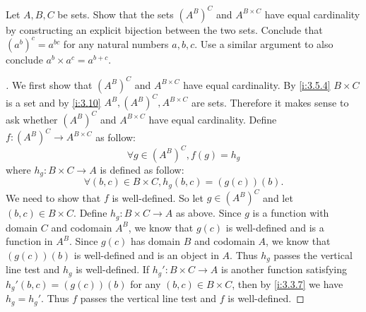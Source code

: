 \begin{ex}\label{i:ex:3.6.6}
  Let \(A, B, C\) be sets.
  Show that the sets \((A^B)^C\) and \(A^{B \times C}\) have equal cardinality by constructing an explicit bijection between the two sets.
  Conclude that \((a^b)^c = a^{bc}\) for any natural numbers \(a, b, c\).
  Use a similar argument to also conclude \(a^b \times a^c = a^{b+c}\).
\end{ex}

\begin{proof}[]
  We first show that \((A^B)^C\) and \(A^{B \times C}\) have equal cardinality.
  By \cref{i:3.5.4} \(B \times C\) is a set and by \cref{i:3.10} \(A^B, (A^B)^C, A^{B \times C}\) are sets.
  Therefore it makes sense to ask whether \((A^B)^C\) and \(A^{B \times C}\) have equal cardinality.
  Define \(f : (A^B)^C \to A^{B \times C}\) as follow:
  \[
    \forall g \in (A^B)^C, f(g) = h_g
  \]
  where \(h_g : B \times C \to A\) is defined as follow:
  \[
    \forall (b, c) \in B \times C, h_g(b, c) = (g(c))(b).
  \]
  We need to show that \(f\) is well-defined.
  So let \(g \in (A^B)^C\) and let \((b, c) \in B \times C\).
  Define \(h_g : B \times C \to A\) as above.
  Since \(g\) is a function with domain \(C\) and codomain \(A^B\), we know that \(g(c)\) is well-defined and is a function in \(A^B\).
  Since \(g(c)\) has domain \(B\) and codomain \(A\), we know that \((g(c))(b)\) is well-defined and is an object in \(A\).
  Thus \(h_g\) passes the vertical line test and \(h_g\) is well-defined.
  If \(h_g' : B \times C \to A\) is another function satisfying \(h_g'(b, c) = (g(c))(b)\) for any \((b, c) \in B \times C\), then by \cref{i:3.3.7} we have \(h_g = h_g'\).
  Thus \(f\) passes the vertical line test and \(f\) is well-defined.


\end{proof}
